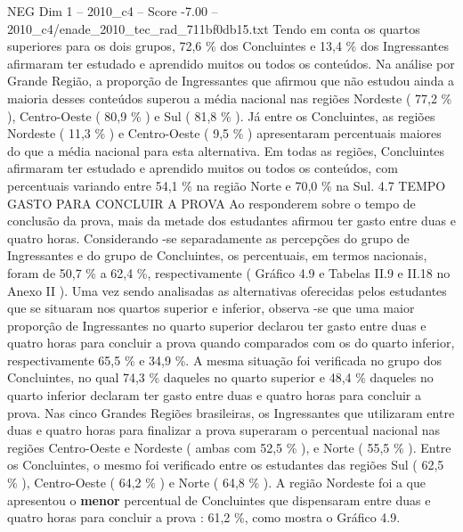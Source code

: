 \begin{textsample}{NEG Dim 1 – 2010\_c4 – Score -7.00 – 2010\_c4/enade\_2010\_tec\_rad\_711bf0db15.txt}
Tendo em conta os quartos superiores para os dois grupos, 72,6 \% dos Concluintes e 13,4 \% dos Ingressantes afirmaram ter estudado e aprendido muitos ou todos os conteúdos.
Na análise por Grande Região, a proporção de Ingressantes que afirmou que não estudou ainda a maioria desses conteúdos superou a média nacional nas regiões Nordeste ( 77,2 \% ), Centro-Oeste ( 80,9 \% ) e Sul ( 81,8 \% ).
Já entre os Concluintes, as regiões Nordeste ( 11,3 \% ) e Centro-Oeste ( 9,5 \% ) apresentaram percentuais maiores do que a média nacional para esta alternativa.
Em todas as regiões, Concluintes afirmaram ter estudado e aprendido muitos ou todos os conteúdos, com percentuais variando entre 54,1 \% na região Norte e 70,0 \% na Sul. 4.7 TEMPO GASTO PARA CONCLUIR A PROVA Ao responderem sobre o tempo de conclusão da prova, mais da metade dos estudantes afirmou ter gasto entre duas e quatro horas.
Considerando -se separadamente as percepções do grupo de Ingressantes e do grupo de Concluintes, os percentuais, em termos nacionais, foram de 50,7 \% a 62,4 \%, respectivamente ( Gráfico 4.9 e Tabelas II.9 e II.18 no Anexo II ).
Uma vez sendo analisadas as alternativas oferecidas pelos estudantes que se situaram nos quartos superior e inferior, observa -se que uma maior proporção de Ingressantes no quarto superior declarou ter gasto entre duas e quatro horas para concluir a prova quando comparados com os do quarto inferior, respectivamente 65,5 \% e 34,9 \%.
A mesma situação foi verificada no grupo dos Concluintes, no qual 74,3 \% daqueles no quarto superior e 48,4 \% daqueles no quarto inferior declaram ter gasto entre duas e quatro horas para concluir a prova.
Nas cinco Grandes Regiões brasileiras, os Ingressantes que utilizaram entre duas e quatro horas para finalizar a prova superaram o percentual nacional nas regiões Centro-Oeste e Nordeste ( ambas com 52,5 \% ), e Norte ( 55,5 \% ).
Entre os Concluintes, o mesmo foi verificado entre os estudantes das regiões Sul ( 62,5 \% ), Centro-Oeste ( 64,2 \% ) e Norte ( 64,8 \% ).
A região Nordeste foi a que apresentou o \textbf{menor} percentual de Concluintes que dispensaram entre duas e quatro horas para concluir a prova : 61,2 \%, como mostra o Gráfico 4.9.

\end{textsample}
